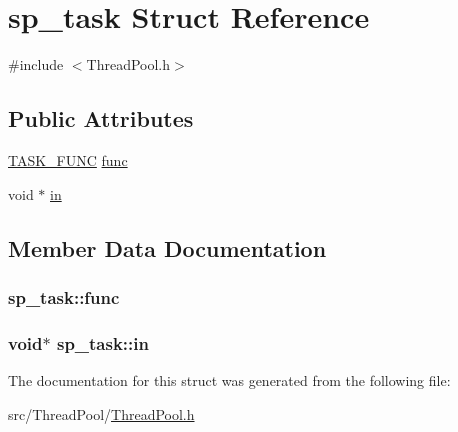 \hypertarget{structsp__task}{\section{sp\+\_\+task Struct Reference}
\label{structsp__task}
}


{\ttfamily \#include $<$Thread\+Pool.\+h$>$}

\subsection*{Public Attributes}
\begin{DoxyCompactItemize}
\item 
\hyperlink{_thread_pool_8h_a1eaa8749a99b9897592baf359529489b}{T\+A\+S\+K\+\_\+\+F\+U\+N\+C} \hyperlink{structsp__task_a6f57b2556c9756ba01dd48ed81241636}{func}
\item 
void $\ast$ \hyperlink{structsp__task_af558b254a2a1f6e80fd6060a0323f82a}{in}
\end{DoxyCompactItemize}


\subsection{Member Data Documentation}
\hypertarget{structsp__task_a6f57b2556c9756ba01dd48ed81241636}{
\subsubsection[{func}]{ sp\+\_\+task\+::func}}\label{structsp__task_a6f57b2556c9756ba01dd48ed81241636}
\hypertarget{structsp__task_af558b254a2a1f6e80fd6060a0323f82a}{
\subsubsection[{in}]{\setlength{\rightskip}{0pt plus 5cm}void$\ast$ sp\+\_\+task\+::in}}\label{structsp__task_af558b254a2a1f6e80fd6060a0323f82a}


The documentation for this struct was generated from the following file\+:\begin{DoxyCompactItemize}
\item 
src/\+Thread\+Pool/\hyperlink{_thread_pool_8h}{Thread\+Pool.\+h}\end{DoxyCompactItemize}
